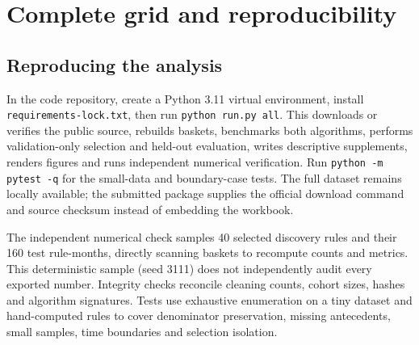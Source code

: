 \section{Complete grid and reproducibility}
\begin{table}[!htbp]
\centering\small

\caption{Discovery grid, mean retention and test evaluability. ``Validation'' and ``Test'' are retention under the common monthly thresholds. The 14-rule row is below the primary selection floor.}
\end{table}

\subsection*{Reproducing the analysis}
In the code repository, create a Python 3.11 virtual environment, install \texttt{requirements-lock.txt}, then run \texttt{python run.py all}. This downloads or verifies the public source, rebuilds baskets, benchmarks both algorithms, performs validation-only selection and held-out evaluation, writes descriptive supplements, renders figures and runs independent numerical verification. Run \texttt{python -m pytest -q} for the small-data and boundary-case tests. The full dataset remains locally available; the submitted package supplies the official download command and source checksum instead of embedding the workbook.

The independent numerical check samples 40 selected discovery rules and their 160 test rule-months, directly scanning baskets to recompute counts and metrics. This deterministic sample (seed 3111) does not independently audit every exported number. Integrity checks reconcile cleaning counts, cohort sizes, hashes and algorithm signatures. Tests use exhaustive enumeration on a tiny dataset and hand-computed rules to cover denominator preservation, missing antecedents, small samples, time boundaries and selection isolation.

